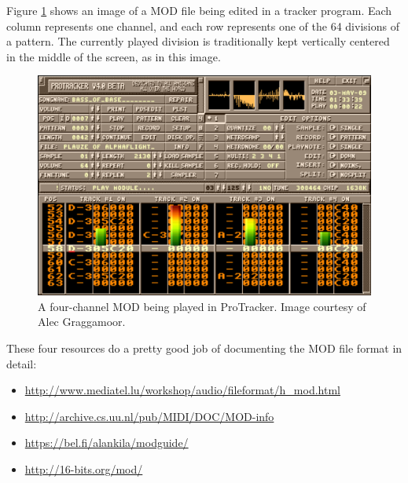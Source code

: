 Figure \ref{img-protracker} shows an image of a MOD file being edited in a tracker program.
Each column represents one channel, and each row represents one of the 64 divisions of a pattern.
The currently played division is traditionally kept vertically centered in the middle of the screen, as in this image.


\begin{figure}[H]
	\includegraphics[width = \textwidth]{images/Protracker.png}
	\caption{A four-channel MOD being played in ProTracker. Image courtesy of Alec Graggamoor.}
	\label{img-protracker}
\end{figure}

These four resources do a pretty good job of documenting the MOD file format in detail:
\begin{itemize}
	\item{\url{http://www.mediatel.lu/workshop/audio/fileformat/h_mod.html}}
	\item{\url{http://archive.cs.uu.nl/pub/MIDI/DOC/MOD-info}}
	\item{\url{https://bel.fi/alankila/modguide/}}
	\item{\url{http://16-bits.org/mod/}}
\end{itemize}

\newpage
